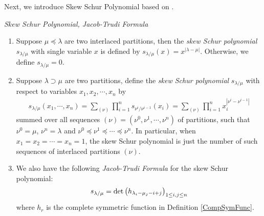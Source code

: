 Next, we introduce Skew Schur Polynomial based on \cite[Chapter 1, (5.4), (5.11), (5.12)]{Mac}.
\begin{definition} \emph{Skew Schur Polynomial, Jacob-Trudi Formula}{\label{DefSkewSchurPoly}}
\begin{enumerate}
	\item Suppose $\mu\preceq\lambda$ are two interlaced partitions, then the \emph{skew Schur polynomial} $s_{\lambda/\mu}$ with single variable $x$ is defined by $s_{\lambda/\mu}(x)=x^{|\lambda-\mu|}$. Otherwise, we define $s_{\lambda/\mu}=0$.
	\item Suppose $\lambda\supset\mu$ are two partitions, define the \emph{skew Schur polynomial} $s_{\lambda/\mu}$ with respect to variables $x_1, x_2, \cdots, x_{n}$ by
	\begin{align}
		s_{\lambda/\mu}(x_1,\cdots,x_n)=\sum_{(\nu)}\prod_{i=1}^{n}s_{\nu^{i}/\nu^{i-1}}(x_i)=\sum_{(\nu)}\prod_{i=1}^{n}x_{i}^{|\nu^{i}-\nu^{i-1}|}
	\end{align}
	summed over all sequences $(\nu)=(\nu^{0},\nu^{1},\cdots,\nu^{n})$ of partitions, such that $\nu^{0}=\mu$, $\nu^{n}=\lambda$ and $\nu^{0}\preceq\nu^{1}\preceq\cdots\preceq\nu^{n}$. In particular, when $x_1=x_2=\cdots=x_{n}=1$, the skew Schur polynomial is just the number of such sequences of interlaced partitions $(\nu)$.
	\item We also have the following \emph{Jacob-Trudi Formula}\cite[Chapter 1, (5.4)]{Mac} for the skew Schur polynomial:
	\begin{align}{\label{J-TFormula}}
		s_{\lambda/\mu}=\det\left(h_{\lambda_{i}-\mu_{j}-i+j}\right)_{1\leq i,j\leq n}
	\end{align}
	where $h_r$ is the complete symmetric function in Definition \ref{CompSymFunc}.
\end{enumerate}
\end{definition}

